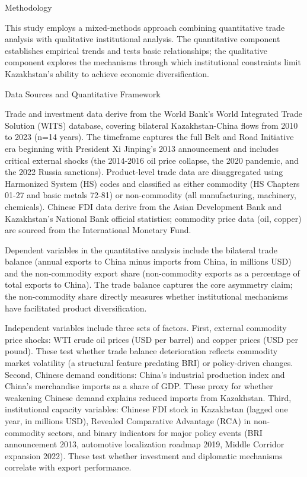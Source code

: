 \documentclass[12pt]{article}
\begin{document}
Methodology\par
This study employs a mixed-methods approach combining quantitative trade analysis with qualitative institutional analysis. The quantitative component establishes empirical trends and tests basic relationships; the qualitative component explores the mechanisms through which institutional constraints limit Kazakhstan's ability to achieve economic diversification.\par
Data Sources and Quantitative Framework\par
Trade and investment data derive from the World Bank's World Integrated Trade Solution (WITS) database, covering bilateral Kazakhstan-China flows from 2010 to 2023 (n=14 years). The timeframe captures the full Belt and Road Initiative era beginning with President Xi Jinping's 2013 announcement and includes critical external shocks (the 2014-2016 oil price collapse, the 2020 pandemic, and the 2022 Russia sanctions). Product-level trade data are disaggregated using Harmonized System (HS) codes and classified as either commodity (HS Chapters 01-27 and basic metals 72-81) or non-commodity (all manufacturing, machinery, chemicals). Chinese FDI data derive from the Asian Development Bank and Kazakhstan's National Bank official statistics; commodity price data (oil, copper) are sourced from the International Monetary Fund.\par
Dependent variables in the quantitative analysis include the bilateral trade balance (annual exports to China minus imports from China, in millions USD) and the non-commodity export share (non-commodity exports as a percentage of total exports to China). The trade balance captures the core asymmetry claim; the non-commodity share directly measures whether institutional mechanisms have facilitated product diversification.\par
Independent variables include three sets of factors. First, external commodity price shocks: WTI crude oil prices (USD per barrel) and copper prices (USD per pound). These test whether trade balance deterioration reflects commodity market volatility (a structural feature predating BRI) or policy-driven changes. Second, Chinese demand conditions: China's industrial production index and China's merchandise imports as a share of GDP. These proxy for whether weakening Chinese demand explains reduced imports from Kazakhstan. Third, institutional capacity variables: Chinese FDI stock in Kazakhstan (lagged one year, in millions USD), Revealed Comparative Advantage (RCA) in non-commodity sectors, and binary indicators for major policy events (BRI announcement 2013, automotive localization roadmap 2019, Middle Corridor expansion 2022). These test whether investment and diplomatic mechanisms correlate with export performance.\par
\end{document}
